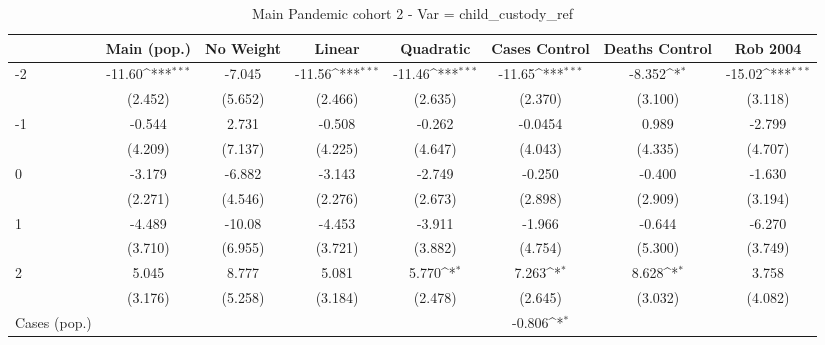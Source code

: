 \documentclass{article}
\begin{document}
{
\def\sym#1{\ifmmode^{#1}\else\(^{#1}\)\fi}
\begin{longtable}{l*{7}{c}}
\caption{Main Pandemic cohort 2 - Var = child\_custody\_ref}\\
\hline\hline\endfirsthead\hline\endhead\hline\endfoot\endlastfoot
                &\multicolumn{1}{c}{Main (pop.)}&\multicolumn{1}{c}{No Weight}&\multicolumn{1}{c}{Linear}&\multicolumn{1}{c}{Quadratic}&\multicolumn{1}{c}{Cases Control}&\multicolumn{1}{c}{Deaths Control}&\multicolumn{1}{c}{Rob 2004}\\
\hline
-2              &   -11.60\sym{***}&   -7.045         &   -11.56\sym{***}&   -11.46\sym{***}&   -11.65\sym{***}&   -8.352\sym{*}  &   -15.02\sym{***}\\
                &  (2.452)         &  (5.652)         &  (2.466)         &  (2.635)         &  (2.370)         &  (3.100)         &  (3.118)         \\
-1              &   -0.544         &    2.731         &   -0.508         &   -0.262         &  -0.0454         &    0.989         &   -2.799         \\
                &  (4.209)         &  (7.137)         &  (4.225)         &  (4.647)         &  (4.043)         &  (4.335)         &  (4.707)         \\
0               &   -3.179         &   -6.882         &   -3.143         &   -2.749         &   -0.250         &   -0.400         &   -1.630         \\
                &  (2.271)         &  (4.546)         &  (2.276)         &  (2.673)         &  (2.898)         &  (2.909)         &  (3.194)         \\
1               &   -4.489         &   -10.08         &   -4.453         &   -3.911         &   -1.966         &   -0.644         &   -6.270         \\
                &  (3.710)         &  (6.955)         &  (3.721)         &  (3.882)         &  (4.754)         &  (5.300)         &  (3.749)         \\
2               &    5.045         &    8.777         &    5.081         &    5.770\sym{*}  &    7.263\sym{*}  &    8.628\sym{*}  &    3.758         \\
                &  (3.176)         &  (5.258)         &  (3.184)         &  (2.478)         &  (2.645)         &  (3.032)         &  (4.082)         \\
Cases (pop.)    &                  &                  &                  &                  &   -0.806\sym{*}  &                  &                  \\

\end{longtable}}
\end{document}
